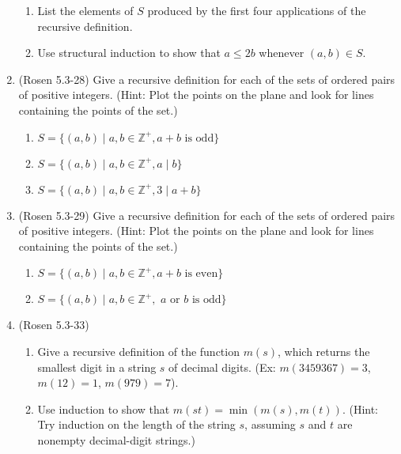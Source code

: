 \begin{enumerate}
\begin{enumerate}
\item \streasy List the elements of $S$ produced by the first four applications 
of the recursive definition.

\item \strmedium Use structural induction to show that $a \leq 2b$ whenever 
$(a,b)\in S$.
\end{enumerate}

\item (Rosen 5.3-28) Give a recursive definition for each of the 
sets of ordered pairs of positive integers. 
(Hint: Plot the points on the plane and look for lines containing 
the points of the set.)

\begin{enumerate}
\item \streasy $S=\{(a,b)  \mid  a,b\in \mathbb{Z}^+, a+b \text{~is odd}\}$

\item \strmedium $S=\{(a,b)  \mid  a,b\in \mathbb{Z}^+, a  \mid  b\}$

\item \strmedium $S=\{(a,b)  \mid  a,b\in \mathbb{Z}^+, 3  \mid  a+b\}$
\end{enumerate}

\item (Rosen 5.3-29) Give a recursive definition for each of the 
sets of ordered pairs of positive integers. 
(Hint: Plot the points on the plane and look for lines containing 
the points of the set.)

\begin{enumerate}
\item \strmedium $S=\{(a,b)  \mid  a,b\in \mathbb{Z}^+, a+b \text{~is even}\}$

\item \strmedium $S=\{(a,b)  \mid  a,b\in \mathbb{Z}^+, \text{~$a$ or $b$ is odd}\}$
\end{enumerate}

\item (Rosen 5.3-33) 
\begin{enumerate}
\item \strmedium Give a recursive definition of the function $m(s)$, which returns the smallest
digit in a string $s$ of decimal digits.
(Ex: $m(3459367)=3$, $m(12)=1$, $m(979)=7$).

\item \strhard Use induction to show that $m(st) = \min(m(s),m(t))$.
(Hint: Try induction on the length of the string $s$, assuming $s$ and $t$ are nonempty decimal-digit strings.)


\end{enumerate}
\end{enumerate}
